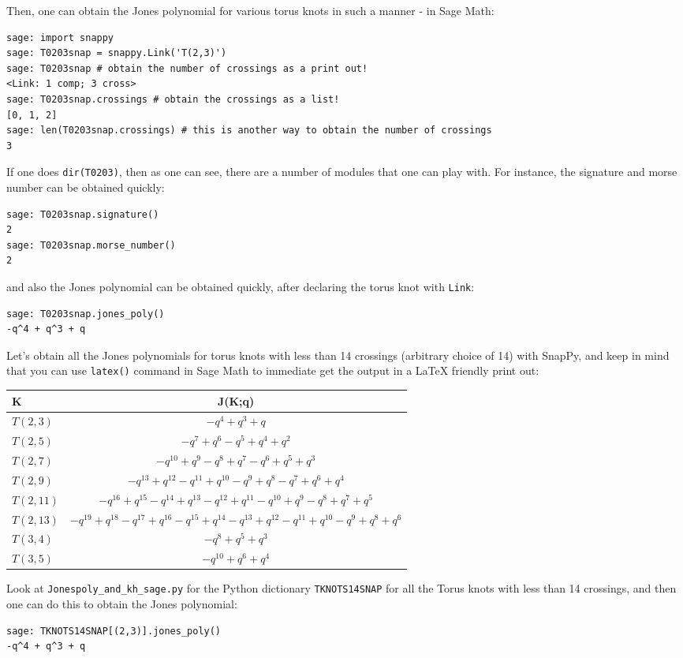 \documentclass[10pt]{amsart}
\begin{document}
\begin{multicols*}{2}
Then, one can obtain the Jones polynomial for various torus knots in such a manner - in Sage Math:
\begin{lstlisting}
sage: import snappy
sage: T0203snap = snappy.Link('T(2,3)')
sage: T0203snap # obtain the number of crossings as a print out!
<Link: 1 comp; 3 cross>
sage: T0203snap.crossings # obtain the crossings as a list!
[0, 1, 2]
sage: len(T0203snap.crossings) # this is another way to obtain the number of crossings
3
\end{lstlisting}
If one does \verb|dir(T0203)|, then as one can see, there are a number of modules that one can play with.  For instance, the signature and morse number can be obtained quickly:
\begin{lstlisting}
sage: T0203snap.signature()
2
sage: T0203snap.morse_number()
2
\end{lstlisting}
and also the Jones polynomial can be obtained quickly, after declaring the torus knot with \verb|Link|:
\begin{lstlisting}
sage: T0203snap.jones_poly()
-q^4 + q^3 + q
\end{lstlisting}

Let's obtain all the Jones polynomials for torus knots with less than 14 crossings (arbitrary choice of 14) with SnapPy, and keep in mind that you can use \verb|latex()| command in Sage Math to immediate get the output in a LaTeX friendly print out:

\begin{center}
\begin{tabular}{l c}
  K & J(K;q) \\ \hline 
  $T(2,3)$ & $-q^{4} + q^{3} + q$ \\
  $T(2,5)$ & $-q^{7} + q^{6} - q^{5} + q^{4} + q^{2}$ \\
  $T(2,7)$ & $-q^{10} + q^{9} - q^{8} + q^{7} - q^{6} + q^{5} + q^{3}$ \\
  $T(2,9)$ & $-q^{13} + q^{12} - q^{11} + q^{10} - q^{9} + q^{8} - q^{7} + q^{6} + q^{4}$  \\
  $T(2,11)$ & $-q^{16} + q^{15} - q^{14} + q^{13} - q^{12} + q^{11} - q^{10} + q^{9} - q^{8} + q^{7} + q^{5}$ \\
  $T(2,13)$ & $-q^{19} + q^{18} - q^{17} + q^{16} - q^{15} + q^{14} - q^{13} + q^{12} - q^{11} + q^{10} - q^{9} + q^{8} + q^{6}$ \\
  $T(3,4)$ & $-q^{8} + q^{5} + q^{3}$ \\
  $T(3,5)$ & $-q^{10} + q^{6} + q^{4}$ 
\end{tabular}
\label{table:JonespolysSnapPy}
\end{center}
Look at \verb|Jonespoly_and_kh_sage.py| for the Python dictionary \verb|TKNOTS14SNAP| for all the Torus knots with less than 14 crossings, and then one can do this to obtain the Jones polynomial:
\begin{lstlisting}
sage: TKNOTS14SNAP[(2,3)].jones_poly()
-q^4 + q^3 + q
\end{lstlisting} 


\end{multicols*}
\end{document}

